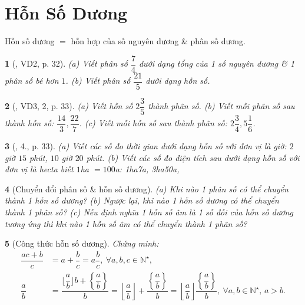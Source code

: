 \documentclass{article}
\newtheorem{baitoan}{}
\begin{document}

\section{Hỗn Số Dương}
Hỗn số dương $=$ hỗn hợp của số nguyên dương \& phân số dương.

\begin{baitoan}[\cite{Binh_Toan_6_tap_2}, VD2, p. 32]
	(a) Viết phân số $\dfrac{7}{4}$ dưới dạng tổng của 1 số nguyên dương \& 1 phân số bé hơn $1$. (b) Viết phân số $\dfrac{21}{5}$ dưới dạng hỗn số.
\end{baitoan}

\begin{baitoan}[\cite{Binh_Toan_6_tap_2}, VD3, 2, p. 33]
	(a) Viết hỗn số $2\dfrac{3}{5}$ thành phân số. (b) Viết mỗi phân số sau thành hỗn số: $\dfrac{14}{3},\dfrac{22}{7}$. (c) Viết mỗi hỗn số sau thành phân số: $2\dfrac{3}{4},5\dfrac{1}{6}$.
\end{baitoan}

\begin{baitoan}[\cite{SGK_Toan_6_Canh_Dieu_tap_2}, 4., p. 33]
	(a) Viết các số đo thời gian dưới dạng hỗn số với đơn vị là giờ: $2$ giờ $15$ phút, $10$ giờ $20$ phút. (b) Viết các số đo diện tích sau dưới dạng hỗn số với đơn vị là hecta biết $1$\emph{ha} $= 100$\emph{a}: \emph{1ha7a, 3ha50a},
\end{baitoan}

\begin{baitoan}[Chuyển đổi phân số \& hỗn số dương]
	(a) Khi nào 1 phân số có thể chuyển thành 1 hỗn số dương? (b) Ngược lại, khi nào 1 hỗn số dương có thể chuyển thành 1 phân số? (c) Nếu định nghĩa 1 \emph{hỗn số âm} là 1 số đối của hỗn số dương tương ứng thì khi nào 1 hỗn số âm có thể chuyển thành 1 phân số?
\end{baitoan}

\begin{baitoan}[Công thức hỗn số dương]
	Chứng minh:
	\begin{align*}
		\dfrac{ac + b}{c} &= a + \dfrac{b}{c} = a\dfrac{b}{c},\ \forall a,b,c\in\mathbb{N}^\star,\\
		\dfrac{a}{b} &= \dfrac{\lfloor\dfrac{a}{b}\rfloor b + \left\{\dfrac{a}{b}\right\}}{b} = \left\lfloor\dfrac{a}{b}\right\rfloor + \dfrac{\left\{\dfrac{a}{b}\right\}}{b} = \left\lfloor\dfrac{a}{b}\right\rfloor\dfrac{\left\{\dfrac{a}{b}\right\}}{b},\ \forall a,b\in\mathbb{N}^\star,\, a > b.
	\end{align*}
\end{baitoan}
\end{document}
